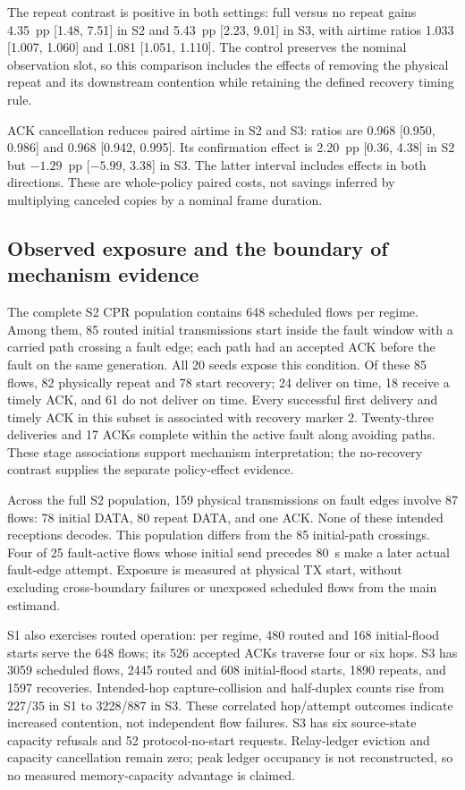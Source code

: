 The repeat contrast is positive in both settings: full versus no repeat
gains 4.35~pp [1.48, 7.51] in S2 and 5.43~pp [2.23, 9.01] in S3,
with airtime ratios 1.033 [1.007, 1.060] and 1.081 [1.051, 1.110].
The control preserves the nominal observation slot, so this comparison
includes the effects of removing the physical repeat and its downstream
contention while retaining the defined recovery timing rule.

ACK cancellation reduces paired airtime in S2 and S3: ratios are
0.968 [0.950, 0.986] and 0.968 [0.942, 0.995]. Its confirmation effect
is 2.20~pp [0.36, 4.38] in S2 but $-1.29$~pp [$-5.99$, 3.38] in
S3. The latter interval includes effects in both directions. These are
whole-policy paired costs, not savings inferred by multiplying canceled
copies by a nominal frame duration.

\subsection{Observed exposure and the boundary of mechanism evidence}

The complete S2 CPR population contains 648 scheduled flows per regime.
Among them, 85 routed initial transmissions start inside the fault window
with a carried path crossing a fault edge; each path had an accepted ACK
before the fault on the same generation. All 20 seeds expose this condition.
Of these 85 flows, 82 physically repeat and 78 start recovery; 24 deliver
on time, 18 receive a timely ACK, and 61 do not deliver on time. Every
successful first delivery and timely ACK in this subset is associated
with recovery marker 2. Twenty-three deliveries and 17 ACKs complete
within the active fault along avoiding paths. These stage associations
support mechanism interpretation; the no-recovery contrast supplies the
separate policy-effect evidence.

Across the full S2 population, 159 physical transmissions on fault edges
involve 87 flows: 78 initial DATA, 80 repeat DATA, and one ACK. None of
these intended receptions decodes. This population differs from the 85
initial-path crossings. Four of 25 fault-active flows whose initial send
precedes 80~s make a later actual fault-edge attempt. Exposure is measured
at physical TX start, without excluding cross-boundary failures or
unexposed scheduled flows from the main estimand.

S1 also exercises routed operation: per regime, 480 routed and 168
initial-flood starts serve the 648 flows; its 526 accepted ACKs traverse
four or six hops. S3 has 3059 scheduled flows, 2445 routed and 608
initial-flood starts, 1890 repeats, and 1597 recoveries. Intended-hop
capture-collision and half-duplex counts rise from 227/35 in S1 to
3228/887 in S3. These correlated hop/attempt outcomes indicate increased
contention, not independent flow failures. S3 has six source-state
capacity refusals and 52 protocol-no-start requests. Relay-ledger eviction
and capacity cancellation remain zero; peak ledger occupancy is not
reconstructed, so no measured memory-capacity advantage is claimed.

